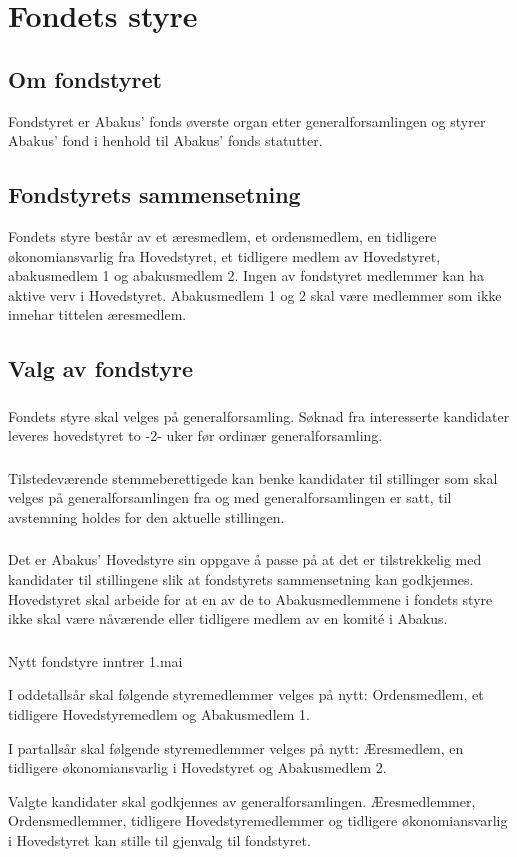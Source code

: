 \section{Fondets styre}
\subsection{Om fondstyret}
Fondstyret er Abakus’ fonds øverste organ etter generalforsamlingen og styrer
Abakus’ fond i henhold til Abakus’ fonds statutter.

\subsection{Fondstyrets sammensetning}
Fondets styre består av et æresmedlem, et ordensmedlem, en tidligere økonomiansvarlig fra
Hovedstyret, et tidligere medlem av Hovedstyret, abakusmedlem 1 og abakusmedlem 2.
Ingen av fondstyret medlemmer kan ha aktive verv i Hovedstyret. Abakusmedlem 1 og 2 skal
være medlemmer som ikke innehar tittelen æresmedlem.

\subsection{Valg av fondstyre}
\subsubsection{}
Fondets styre skal velges på generalforsamling. Søknad fra interesserte kandidater
leveres hovedstyret to -2- uker før ordinær generalforsamling.

\subsubsection{}
Tilstedeværende stemmeberettigede kan benke kandidater til stillinger som skal velges
på generalforsamlingen fra og med generalforsamlingen er satt, til avstemning holdes for
den aktuelle stillingen.

\subsubsection{}
Det er Abakus’ Hovedstyre sin oppgave å passe på at det er tilstrekkelig med kandidater til
stillingene slik at fondstyrets sammensetning kan godkjennes. Hovedstyret skal arbeide for
at en av de to Abakusmedlemmene i fondets styre ikke skal være nåværende eller tidligere
medlem av en komité i Abakus.

\subsubsection{}
Nytt fondstyre inntrer 1.mai

I oddetallsår skal følgende styremedlemmer velges på nytt: Ordensmedlem, et tidligere
Hovedstyremedlem og Abakusmedlem 1.

I partallsår skal følgende styremedlemmer velges på nytt: Æresmedlem, en tidligere
økonomiansvarlig i Hovedstyret og Abakusmedlem 2.

Valgte kandidater skal godkjennes av generalforsamlingen. Æresmedlemmer, Ordensmedlemmer, 
tidligere Hovedstyremedlemmer og tidligere økonomiansvarlig i Hovedstyret kan
stille til gjenvalg til fondstyret.
